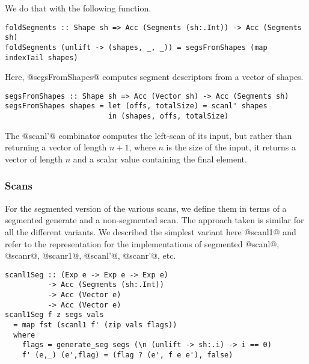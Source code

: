 %
We do that with the following function.
%
\begin{lstlisting}
foldSegments :: Shape sh => Acc (Segments (sh:.Int)) -> Acc (Segments sh)
foldSegments (unlift -> (shapes, _, _)) = segsFromShapes (map indexTail shapes)
\end{lstlisting}
%
Here, @segsFromShapes@ computes segment descriptors from a vector of shapes.
%
\begin{lstlisting}
segsFromShapes :: Shape sh => Acc (Vector sh) -> Acc (Segments sh)
segsFromShapes shapes = let (offs, totalSize) = scanl' shapes
                        in (shapes, offs, totalSize)
\end{lstlisting}
%
The @scanl'@ combinator computes the left-scan of its input, but rather than returning a vector of length $n+1$, where $n$ is the size of the input, it returns a vector of length $n$ and a scalar value containing the final element.

\subsubsection{Scans}

For the segmented version of the various scans, we define them in terms of a segmented generate and a non-segmented scan. The approach taken is similar for all the different variants. We described the simplest variant here @scanl1@ and refer to the representation for the implementations of segmented @scanl@, @scanr@, @scanr1@, @scanl'@, @scanr'@, etc.
%
\begin{lstlisting}
scanl1Seg :: (Exp e -> Exp e -> Exp e)
          -> Acc (Segments (sh:.Int))
          -> Acc (Vector e)
          -> Acc (Vector e)
scanl1Seg f z segs vals
  = map fst (scanl1 f' (zip vals flags))
  where
    flags = generate_seg segs (\n (unlift -> sh:.i) -> i == 0)
    f' (e,_) (e',flag) = (flag ? (e', f e e'), false)
\end{lstlisting}
%

